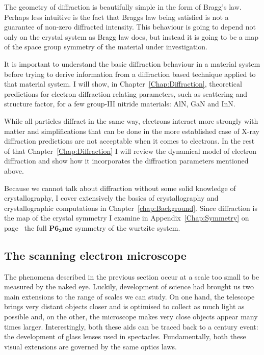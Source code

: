 The geometry of diffraction is beautifully simple in the form of Bragg's law. Perhaps less intuitive is the fact that Braggs law being satisfied is not a guarantee of non-zero diffracted intensity. This behaviour is going to depend not only on the crystal system as Bragg law does, but instead it is going to be a map of the space group symmetry of the material under investigation. 

It is important to understand the basic diffraction behaviour in a material system before trying to derive information from a diffraction based technique applied to that material system. I will show, in Chapter~\ref{Chap:Diffraction}, theoretical predictions for electron diffraction relating parameters, such as scattering and structure factor, for a few group-III nitride materials: AlN, GaN and InN. 

While all particles diffract in the same way, electrons interact more strongly with matter and simplifications that can be done in the more established case of X-ray diffraction predictions are not acceptable when it comes to electrons. In the rest of that Chapter~\ref{Chap:Diffraction} I will review the dynamical model of electron diffraction and show how it incorporates the diffraction parameters mentioned above.

Because we cannot talk about diffraction without some solid knowledge of crystallography, I cover extensively the basics of crystallography and crystallographic computations in Chapter~\ref{chap:Background}. Since diffraction is the map of the crystal symmetry I examine in Appendix~\ref{Chap:Symmetry} on page~\pageref{Chap:Symmetry} the full $\mathbf{P6_3mc}$ symmetry of the wurtzite system.  

\subsection{The scanning electron microscope}
\label{sec:sem}
The phenomena described in the previous section occur at a scale too small to be measured by the naked eye. Luckily,  development of science had brought us two main extensions  to the range of scales we can study. On one hand,  the telescope brings very distant objects closer and is optimised to collect as much light as possible and, on the other, the microscope makes very close objects appear many times larger.
Interestingly, both these aids can be traced back to a  century event: the development of glass lenses used in spectacles. Fundamentally, both these visual extensions are governed by the same optics laws. 

